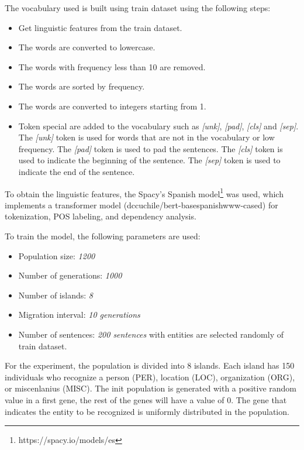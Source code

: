 \documentclass{IEEEtran}
\begin{document}
The vocabulary used is built using train dataset using the following steps:
\begin{itemize}
  \item Get linguistic features from the train dataset.
  \item The words are converted to lowercase.
  \item The words with frequency less than 10 are removed.
  \item The words are sorted by frequency.
  \item The words are converted to integers starting from 1.
  \item Token special are added to the vocabulary such as \textit{[unk]},  \textit{[pad]}, \textit{[cls]} and \textit{[sep]}. The \textit{[unk]} token is used for words that are not in the vocabulary or low frequency. The \textit{[pad]} token is used to pad the sentences. The \textit{[cls]} token is used to indicate the beginning of the sentence. The \textit{[sep]} token is used to indicate the end of the sentence.
\end{itemize}

To obtain the linguistic features, the Spacy's Spanish model\footnote{https://spacy.io/models/es} was used, which implements a transformer model (dccuchile/bert\--base\-spanish\-www\--cased) for tokenization, POS labeling, and dependency analysis.

To train the model, the following parameters are used:
\begin{itemize}
  \item Population size: \textit{1200}
  \item Number of generations: \textit{1000}
  \item Number of islands: \textit{8}
  \item Migration interval: \textit{10 generations}
  \item Number of sentences: \textit{200 sentences} with entities are selected randomly of train dataset.
\end{itemize}



For the experiment, the population is divided into 8 islands. Each island has 150 individuals who recognize a person (PER), location (LOC), organization (ORG), or miscenlanius (MISC). The init population is generated with a positive random value in a first gene, the rest of the genes will have a value of 0. The gene that indicates the entity to be recognized is uniformly distributed in the population.
\end{document}
